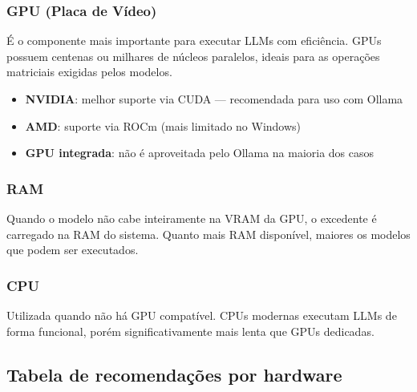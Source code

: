 \documentclass[
]{article}
\providecommand{\tightlist}{%
  \setlength{\itemsep}{0pt}\setlength{\parskip}{0pt}}
\begin{document}
\subsubsection{GPU (Placa de Vídeo)}\label{gpu-placa-de-vuxeddeo}

É o componente mais importante para executar LLMs com eficiência. GPUs
possuem centenas ou milhares de núcleos paralelos, ideais para as
operações matriciais exigidas pelos modelos.

\begin{itemize}
\tightlist
\item
  \textbf{NVIDIA}: melhor suporte via CUDA --- recomendada para uso com
  Ollama
\item
  \textbf{AMD}: suporte via ROCm (mais limitado no Windows)
\item
  \textbf{GPU integrada}: não é aproveitada pelo Ollama na maioria dos
  casos
\end{itemize}

\subsubsection{RAM}\label{ram}

Quando o modelo não cabe inteiramente na VRAM da GPU, o excedente é
carregado na RAM do sistema. Quanto mais RAM disponível, maiores os
modelos que podem ser executados.

\subsubsection{CPU}\label{cpu}

Utilizada quando não há GPU compatível. CPUs modernas executam LLMs de
forma funcional, porém significativamente mais lenta que GPUs dedicadas.

\subsection{Tabela de recomendações por
hardware}\label{tabela-de-recomendauxe7uxf5es-por-hardware}
\end{document}
